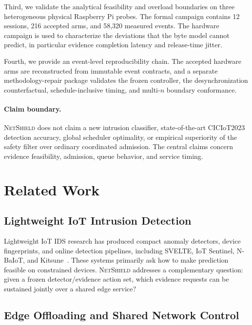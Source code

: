 \documentclass[10pt,journal]{IEEEtran}
\newcommand{\NetShield}{\textsc{NetShield}}
\begin{document}
Third, we validate the analytical feasibility and overload boundaries
on three heterogeneous physical Raspberry Pi probes. The formal
campaign contains 12 sessions, 216 accepted arms, and 58,320 measured
events. The hardware campaign is used to characterize the deviations
that the byte model cannot predict, in particular evidence completion
latency and release-time jitter.

Fourth, we provide an event-level reproducibility chain. The accepted
hardware arms are reconstructed from immutable event contracts, and a
separate methodology-repair package validates the frozen controller,
the desynchronization counterfactual, schedule-inclusive timing, and
multi-$n$ boundary conformance.

\paragraph{Claim boundary.}
\NetShield{} does not claim a new intrusion classifier, state-of-the-art
CICIoT2023 detection accuracy, global scheduler optimality, or empirical
superiority of the safety filter over ordinary coordinated admission.
The central claims concern evidence feasibility, admission, queue
behavior, and service timing.

\section{Related Work}
\label{sec:related}

\subsection{Lightweight IoT Intrusion Detection}

Lightweight IoT IDS research has produced compact anomaly detectors,
device fingerprints, and online detection pipelines, including SVELTE,
IoT Sentinel, N-BaIoT, and Kitsune~\cite{raza2013svelte,
miettinen2017iotsentinel,meidan2018nbaiot,mirsky2018kitsune}.
These systems primarily ask how to make prediction feasible on
constrained devices. \NetShield{} addresses a complementary question:
given a frozen detector/evidence action set, which evidence requests can
be sustained jointly over a shared edge service?

\subsection{Edge Offloading and Shared Network Control}
\end{document}
